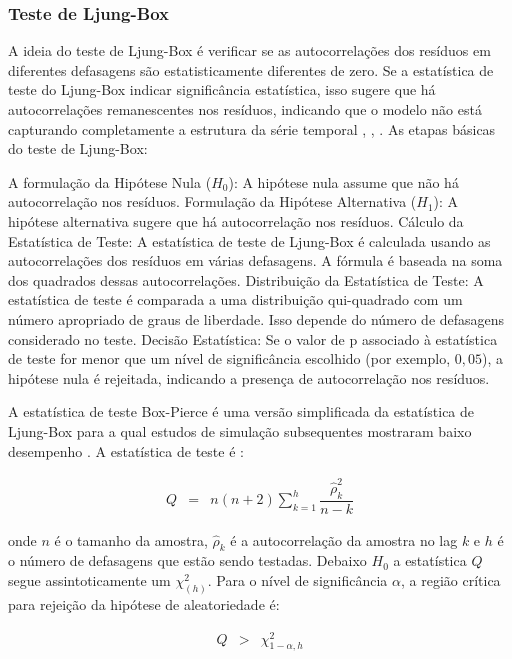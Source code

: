  \subsubsection{Teste de Ljung-Box}
 
A ideia do teste de Ljung-Box é verificar se as autocorrelações dos resíduos em diferentes defasagens são estatisticamente diferentes de zero. Se a estatística de teste do Ljung-Box indicar significância estatística, isso sugere que há autocorrelações remanescentes nos resíduos, indicando que o modelo não está capturando completamente a estrutura da série temporal \cite{box}, \cite{ljung}, \cite{dav}. As etapas básicas do teste de Ljung-Box:

A formulação da Hipótese Nula ($H_0$): A hipótese nula assume que não há autocorrelação nos resíduos.
Formulação da Hipótese Alternativa ($H_1$): A hipótese alternativa sugere que há autocorrelação nos resíduos.
Cálculo da Estatística de Teste: A estatística de teste de Ljung-Box é calculada usando as autocorrelações dos resíduos em várias defasagens. A fórmula é baseada na soma dos quadrados dessas autocorrelações.
Distribuição da Estatística de Teste: A estatística de teste é comparada a uma distribuição qui-quadrado com um número apropriado de graus de liberdade. Isso depende do número de defasagens considerado no teste.
Decisão Estatística: Se o valor de p associado à estatística de teste for menor que um nível de significância escolhido (por exemplo, $0,05$), a hipótese nula é rejeitada, indicando a presença de autocorrelação nos resíduos.
 
A estatística de teste Box-Pierce é uma versão simplificada da estatística de Ljung-Box para a qual estudos de simulação subsequentes mostraram baixo desempenho \cite{dav}. A estatística de teste é \cite{ljung}:
 
 \begin{eqnarray}
 	Q&=&n(n+2) \sum_{k=1}^h \dfrac{\hat{\rho}_k^2}{n-k}
 \end{eqnarray}
 
\noindent onde $n$ é o tamanho da amostra, $\hat{\rho}_k$ é a autocorrelação da amostra no lag $k$ e $h$ é o número de defasagens que estão sendo testadas. Debaixo $H_0$ a estatística $Q$ segue assintoticamente um $\chi_{(h)}^2$. Para o nível de significância $\alpha$, a região crítica para rejeição da hipótese de aleatoriedade é:
 
\begin{eqnarray}
 	Q&>&\chi_{1-\alpha, h}^2
\end{eqnarray}
 
